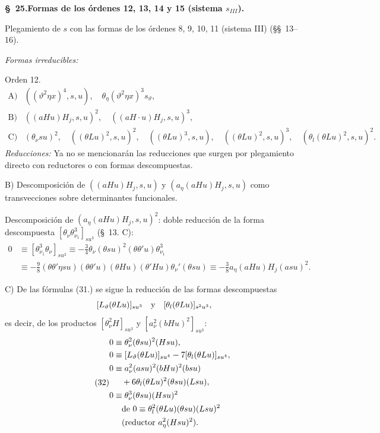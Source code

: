 \documentclass[11pt]{article}
\begin{document}
\begin{center}\textbf{\S\ 25.\quad Formas de los órdenes 12, 13, 14 y 15 (sistema $s_{III}$).}\end{center}
Plegamiento de $s$ con las formas de los órdenes 8, 9, 10, 11 (sistema III) (\S\S\ 13--16).

\noindent\emph{Formas irreducibles:}

\noindent Orden 12.
\[
\begin{array}{rl}
\text{A)}& ((\vartheta^2\eta x)^4,s,u),\quad \theta_\eta(\vartheta^2\eta x)^3s_\vartheta,\\
\text{B)}& ((aHu)H_j,s,u)^2,
\quad ((aH\cdot u)H_j,s,u)^3,\\
\text{C)}& (\theta_\nu su)^2,
\quad ((\theta Lu)^2,s,u)^2,
\quad ((\theta Lu)^3,s,u),
\quad ((\theta Lu)^2,s,u)^3,
\quad (\theta_l(\theta Lu)^2,s,u)^2.
\end{array}
\]
\noindent\emph{Reducciones:} Ya no se mencionarán las reducciones que surgen por plegamiento directo con reductores o con formas descompuestas.

B) Descomposición de $((aHu)H_j,s,u)$ y $(a_\eta(aHu)H_j,s,u)$ como transvecciones sobre determinantes funcionales.

Descomposición de $(a_\eta(aHu)H_j,s,u)^2$: doble reducción de la forma descompuesta $[\theta_\nu\theta_{\nu_1}^3]_{su^3}$ (\S\ 13. C):
\begin{align*}
0&\equiv[\theta_{\nu_1}^3\theta_\nu]_{su^3}
\equiv-\frac34\theta_\nu(\theta su)^2(\theta\theta'u)\theta_{\nu_1}^3\\
&\equiv-\frac98(\theta\theta'\eta su)(\theta\theta'u)(\theta Hu)(\theta'Hu)\theta_\nu'(\theta su)
\equiv-\frac38a_\eta(aHu)H_j(asu)^2.
\end{align*}

C) De las fórmulas (31.) se sigue la reducción de las formas descompuestas
\[
 [L_\vartheta(\theta Lu)]_{su^3}\quad\hbox{y}\quad [\theta_l(\theta Lu)]_{s^2u^3},
\]
es decir, de los productos $[\theta_\nu^2H]_{su^3}$ y $[a_\nu^2(bHu)^2]_{su^3}$:
\begin{equation}
\tag{32}
\begin{aligned}
0&\equiv\theta_\nu^2(\theta su)^2(Hsu),\\
0&\equiv [L_\vartheta(\theta Lu)]_{su^4}-7[\theta_l(\theta Lu)]_{su^4},\\
0&\equiv a_\nu^2(asu)^2(bHu)^2(bsu)\\
&\quad+6\theta_l(\theta Lu)^2(\theta su)(Lsu),\\
0&\equiv\theta_\nu^3(\theta su)(Hsu)^2\\
&\quad\hbox{de }0\equiv\theta_l^2(\theta Lu)(\theta su)(Lsu)^2\\
&\quad(\hbox{reductor }a_\eta^2(Hsu)^2).
\end{aligned}
\end{equation}
\end{document}
